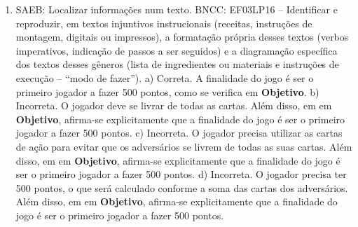 \begin{enumerate}
\item
SAEB: Localizar informações num texto.
BNCC: EF03LP16 -- Identificar e reproduzir, em textos injuntivos
instrucionais (receitas, instruções de montagem, digitais ou impressos),
a formatação própria desses textos (verbos imperativos, indicação de
passos a ser seguidos) e a diagramação específica dos textos desses
gêneros (lista de ingredientes ou materiais e instruções de execução --
``modo de fazer'').
a) Correta. A finalidade do jogo é ser o primeiro jogador a fazer 500
pontos, como se verifica em \textbf{Objetivo}.
b) Incorreta. O jogador deve se livrar de todas as cartas. Além disso, em 
em \textbf{Objetivo}, afirma-se explicitamente que a finalidade do jogo
é ser o primeiro jogador a fazer 500 pontos.  
c) Incorreta. O jogador precisa utilizar as cartas de ação para evitar
que os adversários se livrem de todas as suas cartas. Além disso, em 
em \textbf{Objetivo}, afirma-se explicitamente que a finalidade do jogo
é ser o primeiro jogador a fazer 500 pontos. 
d) Incorreta. O jogador precisa ter 500 pontos, o que será calculado
conforme a soma das cartas dos adversários. Além disso, em 
em \textbf{Objetivo}, afirma-se explicitamente que a finalidade do jogo
é ser o primeiro jogador a fazer 500 pontos.
\end{enumerate}


